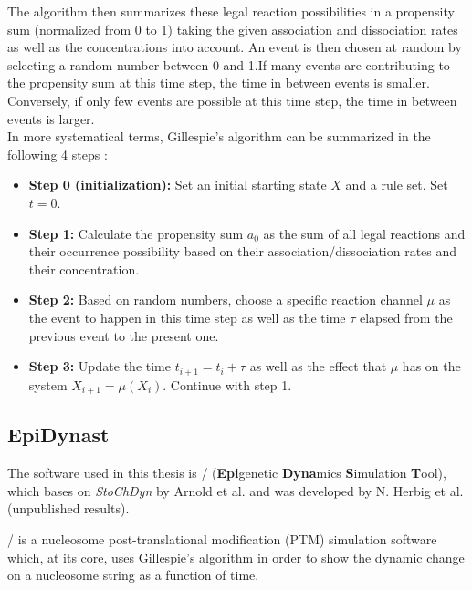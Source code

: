             The algorithm then summarizes these legal reaction possibilities in a propensity sum (normalized from 0 to 1) taking the given association and dissociation rates as well as the concentrations into account. An event is then chosen at random by selecting a random number between 0 and 1.If many events are contributing to the propensity sum at this time step, the time in between events is smaller. Conversely, if only few events are possible at this time step, the time in between events is larger.\\


            In more systematical terms, Gillespie's algorithm can be summarized in the following 4 steps \cite{gillespie1977exact, mayer2020langevin}:

            \begin{itemize}
                \item \textbf{Step 0 (initialization):} Set an initial starting state $X$ and a rule set. Set $t = 0$.
                \item \textbf{Step 1:} Calculate the propensity sum $a_0$ as the sum of all legal reactions and their occurrence possibility based on their association/dissociation rates and their concentration.
                \item \textbf{Step 2:} Based on random numbers, choose a specific reaction channel $\mu$ as the event to happen in this time step as well as the time $\tau$ elapsed from the previous event to the present one.
                \item \textbf{Step 3:} Update the time $t_{i+1} = t_i + \tau$ as well as the effect that $\mu$ has on the system $X_{i+1} = \mu (X_i)$. Continue with step 1.
            \end{itemize}
        \subsection{EpiDynast}
        \label{subsec:EpiDynast}
            The software used in this thesis is \ed/ (\textbf{Epi}genetic \textbf{Dyna}mics \textbf{S}imulation \textbf{T}ool), which bases on \textit{StoChDyn} by Arnold et al. \cite{arnold2013chromatin} and was developed by N. Herbig et al. (unpublished results).

            \ed/ is a nucleosome post-translational modification (PTM) simulation software which, at its core, uses Gillespie's algorithm in order to show the dynamic change on a nucleosome string as a function of time.

